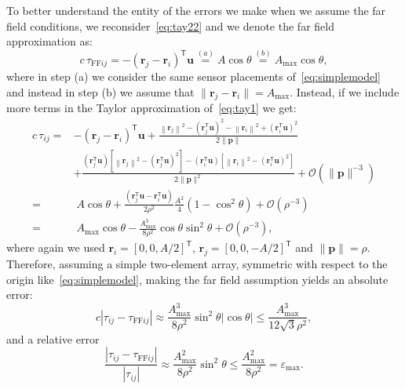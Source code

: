 \noindent
To better understand the entity of the errors we make when we assume the far field conditions, we reconsider~\eqref{eq:tay22} and we denote the far field approximation as:
\begin{equation}
c\,\tau_{\text{FF}ij}
= -\left(\mathbf{r}_j-\mathbf{r}_i\right)^\mathsf{T}\mathbf{u}
\overset{(a)}{=} {A\cos\theta}
\overset{(b)}{=} {A_{\text{max}}\cos\theta},
\end{equation}
where in step (a) we consider the same sensor placements of~\eqref{eq:simplemodel} and instead in step (b) we assume that \(\|\mathbf{r}_j-\mathbf{r}_i\|=A_{\text{max}}\). Instead, if we include more terms in the Taylor approximation of~\eqref{eq:tay1} we get:
\begin{equation}
\begin{aligned}
c\,\tau_{ij}
= & - \left(\mathbf{r}_j-\mathbf{r}_i\right)^\mathsf{T}\mathbf{u}+\frac{\left\|\mathbf{r}_j\right\|^2-\left(\mathbf{r}_j^\mathsf{T}\mathbf{u}  \right)^2-\left\|\mathbf{r}_i\right\|^2+\left(\mathbf{r}_i^\mathsf{T}\mathbf{u}  \right)^2}{2\|\mathbf{p}\|} \\
& +\frac{\left(\mathbf{r}_j^\mathsf{T}\mathbf{u}  \right)\left[\left\|\mathbf{r}_j\right\|^2-\left(\mathbf{r}_j^\mathsf{T}\mathbf{u}  \right)^2\right]-\left(\mathbf{r}_i^\mathsf{T}\mathbf{u}  \right)\left[\left\|\mathbf{r}_i\right\|^2-\left(\mathbf{r}_i^\mathsf{T}\mathbf{u}  \right)^2\right]}{2\|\mathbf{p}\|^2}+\mathcal{O}\left(\|\mathbf{p}\|^{-3}\right)\\
= &\; A \cos \theta+
\frac{\left(\mathbf{r}_j^{\mathsf{T}} \mathbf{u}-\mathbf{r}_i^{\mathsf{T}} \mathbf{u}\right)}{2 \rho^2}\frac{A^2}{4} (1-\cos ^2 \theta)+\mathcal{O}\left(\rho^{-3}\right)\\
= & \; A_{\text{max}} \cos \theta-\frac{A_{\text{max}}^3}{8 \rho^2} \cos \theta \sin ^2 \theta+\mathcal{O}\left(\rho^{-3}\right),
\end{aligned}
\end{equation}
where again we used \(\mathbf{r}_i=[0,0,A/2]^\mathsf{T}\), \(\mathbf{r}_j=[0,0,-A/2]^\mathsf{T}\) and \(\|\mathbf{p}\|=\rho\).
Therefore, assuming a simple two-element array, symmetric with respect to the origin like~\eqref{eq:simplemodel}, making the far field assumption yields an absolute error:
\begin{equation}
c\left|\tau_{ij}-\tau_{\text{FF}ij}\right|
\approx\frac{A_{\text{max}}^3}{8 \rho^2}  \sin ^2 \theta |\cos \theta|\leq\frac{A_{\text{max}}^3}{12 \sqrt{3} \rho^2},
\label{eq:errro1}
\end{equation}
and a relative error
\begin{equation}
\frac{\left|\tau_{ij}-\tau_{\text{FF}ij}\right|}{|\tau_{ij}|}
\approx\frac{A_{\text{max}}^2}{8 \rho^2}  \sin ^2 \theta \leq \frac{A_{\text{max}}^2}{8 \rho^2}=\varepsilon_{\text{max}}.
\label{eq:relativeerr}
\end{equation}

